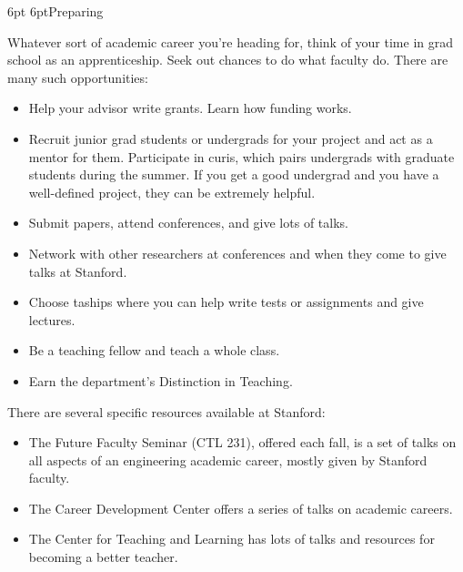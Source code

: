 \documentclass[10pt]{book}
\makeatletter
\renewcommand{\subsection}{\@startsection{subsection}{2}{0mm}%
   {6pt}%
   {6pt}{\normalfont\normalsize\itshape}}
\makeatother
\begin{document}
\subsection{Preparing}

Whatever sort of academic career you're heading for, think of your
time in grad school as an apprenticeship. Seek out chances to do what faculty do.
There are many such opportunities:

\begin{itemize}
\item Help your advisor write grants.  Learn how funding works.
\item Recruit junior grad students or undergrads for your project and act as a
mentor for them. Participate in {\sc curis}, which pairs
undergrads with graduate students during the summer. If you get a good
undergrad and you have a well-defined project, they can be extremely helpful.

\item Submit papers, attend conferences, and give lots of talks.

\item Network with other researchers at conferences and when they come to give
talks at Stanford.

\item Choose {\sc ta}ships where you can help write tests or assignments and
give lectures.

\item Be a teaching fellow and teach a whole class.

\item Earn the department's Distinction in Teaching.
\end{itemize}

There are several specific resources available at Stanford:

\begin{itemize}
\item The Future Faculty Seminar ({\sc CTL} 231), offered each fall, is a set of
talks on all aspects of an engineering academic career, mostly given by
Stanford faculty.

\item The Career Development Center offers a series of talks on academic
careers.

\item The Center for Teaching and Learning has lots of talks and resources for
becoming a better teacher.
\end{itemize}
\end{document}

